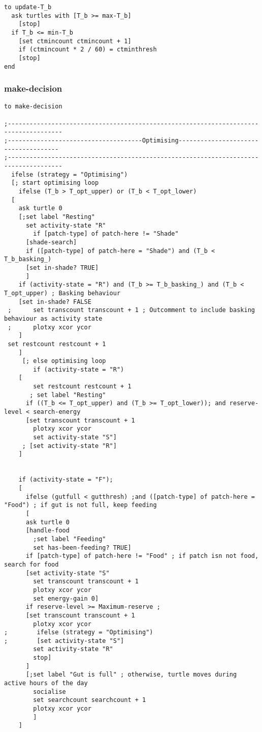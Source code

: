 \documentclass[]{article}
\begin{document}
\begin{verbatim}
to update-T_b
  ask turtles with [T_b >= max-T_b]
    [stop]
  if T_b <= min-T_b
    [set ctmincount ctmincount + 1]
    if (ctmincount * 2 / 60) = ctminthresh
    [stop]
end
\end{verbatim}

\subsubsection{make-decision}\label{make-decision}

\begin{verbatim}
to make-decision

;-------------------------------------------------------------------------------------
;-------------------------------------Optimising-------------------------------------
;-------------------------------------------------------------------------------------
  ifelse (strategy = "Optimising")
  [; start optimising loop
    ifelse (T_b > T_opt_upper) or (T_b < T_opt_lower)
  [
    ask turtle 0
    [;set label "Resting"
      set activity-state "R"
        if [patch-type] of patch-here != "Shade"
      [shade-search]
      if ([patch-type] of patch-here = "Shade") and (T_b < T_b_basking_)
      [set in-shade? TRUE]
      ]
    if (activity-state = "R") and (T_b >= T_b_basking_) and (T_b < T_opt_upper) ; Basking behaviour
    [set in-shade? FALSE
 ;      set transcount transcount + 1 ; Outcomment to include basking behaviour as activity state
 ;      plotxy xcor ycor
    ]
 set restcount restcount + 1
    ]
     [; else optimising loop
        if (activity-state = "R")
    [
        set restcount restcount + 1
       ; set label "Resting"
      if ((T_b <= T_opt_upper) and (T_b >= T_opt_lower)); and reserve-level < search-energy
      [set transcount transcount + 1
        plotxy xcor ycor
        set activity-state "S"]
     ; [set activity-state "R"]
    ]

                               
    if (activity-state = "F"); 
    [                          
      ifelse (gutfull < gutthresh) ;and ([patch-type] of patch-here = "Food") ; if gut is not full, keep feeding
      [
      ask turtle 0
      [handle-food
        ;set label "Feeding"
        set has-been-feeding? TRUE]
      if [patch-type] of patch-here != "Food" ; if patch isn not food, search for food
      [set activity-state "S"
        set transcount transcount + 1
        plotxy xcor ycor
        set energy-gain 0]
      if reserve-level >= Maximum-reserve ; 
      [set transcount transcount + 1
        plotxy xcor ycor
;        ifelse (strategy = "Optimising")
;        [set activity-state "S"]
        set activity-state "R"
        stop]
      ]
      [;set label "Gut is full" ; otherwise, turtle moves during active hours of the day
        socialise
        set searchcount searchcount + 1
        plotxy xcor ycor
        ]
    ]


\end{verbatim}
\end{document}
